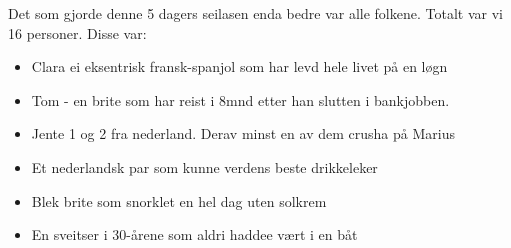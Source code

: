 \clearpage
\begin{figure}[p]
	\vspace*{-2.7cm}
\end{figure}




Det som gjorde denne 5 dagers seilasen enda bedre var alle folkene.
Totalt var vi 16 personer. Disse var: 

\begin{itemize}
	\item Clara ei eksentrisk fransk-spanjol som har levd hele
		livet på en løgn
	\item Tom - en brite som har reist i 8mnd etter han slutten i
		bankjobben.
	\item Jente 1 og 2 fra nederland. Derav minst en av dem crusha på Marius
	\item Et nederlandsk par som kunne verdens beste drikkeleker
	\item Blek brite som snorklet en hel dag uten solkrem
	\item En sveitser i 30-årene som aldri haddee vært i en
		båt
\end{itemize}

